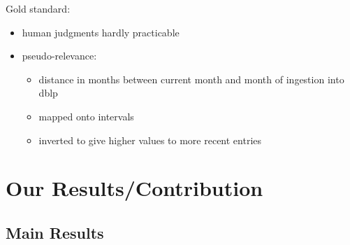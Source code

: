 \documentclass[xcolor={svgnames}]{beamer}
\makeatletter
\newcommand*{\currentname}{\@currentlabelname}
\makeatother
\begin{document}

\begin{frame}{\currentname}\linespread{1.5}
  Gold standard:

  \begin{itemize}
    \item human judgments hardly practicable
    \item pseudo-relevance:
    \begin{itemize}
      \item distance in months between current month and month of ingestion into dblp
      \item mapped onto intervals
      \item inverted to give higher values to more recent entries
    \end{itemize}
  \end{itemize}
\end{frame}

\section{Our Results/Contribution}

\subsection{Main Results}

\end{document}
